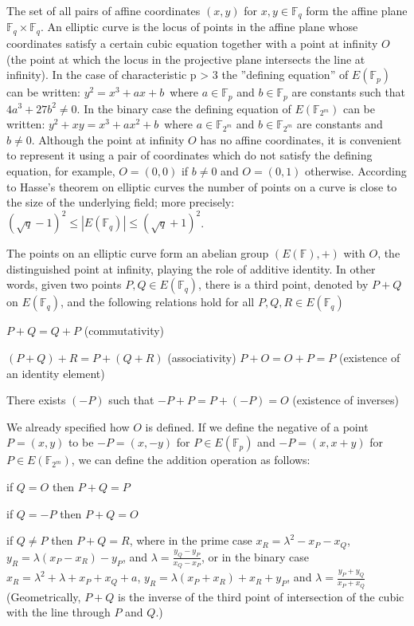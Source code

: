 \documentclass[12pt]{article}
\begin{document}
The set of all pairs of affine coordinates $(x, y)$ for $x, y \in \mathbb{F}_q$ form the affine plane $\mathbb{F}_q \times \mathbb{F}_q$. An elliptic curve is the locus of points in the affine plane whose coordinates satisfy a certain cubic equation together with a point at infinity $O$ (the point at which the locus in the projective plane intersects the line at infinity). In the case of characteristic p > 3 the ''defining equation'' of $E(\mathbb{F}_p)$ can be written: $y^2 = x^3 + a x + b\, $ where $a \in \mathbb{F}_p$ and $b \in \mathbb{F}_p$ are constants such that $4 a^3 + 27 b^2 \ne 0$. In the binary case the defining equation of $E(\mathbb{F}_{2^m})$ can be written: $y^2 + x y = x^3 + a x^2 + b \, $ where $a \in \mathbb{F}_{2^m}$ and $b \in \mathbb{F}_{2^m}$ are constants and $b \ne 0$. 
Although the point at infinity $O$ has no affine coordinates, it is convenient to represent it using a pair of coordinates which do not satisfy the defining equation, for example, $O = (0, 0)$ if $b \ne 0$ and $O = (0, 1)$ otherwise. According to Hasse's theorem on elliptic curves the number of points on a curve is close to the size of the underlying field; more precisely: $(\sqrt q - 1)^2 \leq |E(\mathbb{F}_q)| \leq (\sqrt q + 1)^2$.

The points on an elliptic curve form an abelian group $(E(\mathbb{F}), +)$ with $O$, the distinguished point at infinity, playing the role of additive identity. In other words, given two points $P, Q \in E(\mathbb{F}_q)$, there is a third point, denoted by $P+Q \, $ on $E(\mathbb{F}_q)$, and the following relations hold for all $P, Q, R \in E(\mathbb{F}_q)$

$P + Q = Q+P$ (commutativity)

$(P + Q) + R = P + (Q + R)$ (associativity)
$P + O = O + P = P$ (existence of an identity element)

There exists $(-P)$ such that $-P + P = P + (-P) = O$ (existence of inverses)

We already specified how $O$ is defined. If we define the negative of a point $P = (x, y)$ to be $-P = (x, -y)$ for $P \in E(\mathbb{F}_p)$ and $-P = (x, x+y)$ for $P \in E(\mathbb{F}_{2^m})$, we can define the addition operation as follows:

if $Q = O$ then $P + Q = P$

if $Q = -P$ then $P + Q = O$

if $Q \ne P$ then $P + Q = R$, where in the prime case $x_R = \lambda^2 - x_P - x_Q$, $y_R = \lambda(x_P - x_R) - y_P$, and $\lambda = \frac{y_Q-y_P}{x_Q-x_P}$, or in the binary case $x_R = \lambda^2 + \lambda + x_P + x_Q + a$, $y_R = \lambda (x_P + x_R) + x_R + y_P$, and $\lambda = \frac{y_P + y_Q}{x_P + x_Q}$ (Geometrically, $P + Q$ is the inverse of the third point of intersection of the cubic with the line through $P$ and $Q$.)
\end{document}

